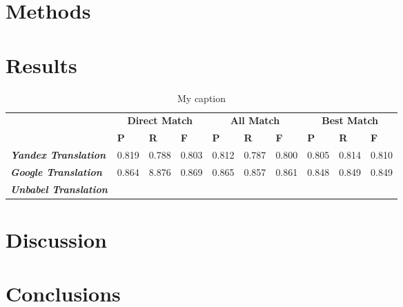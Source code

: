 \label{chap4}



\section{Methods}




\section{Results}

\begin{table}[h]
\centering
\caption{My caption}
\label{table-results}
\begin{tabular}{|l|lll|lll|lll|}
\hline
\multicolumn{1}{|c|}{\textbf{}}       & \multicolumn{3}{c|}{\textbf{Direct Match}}                           & \multicolumn{3}{c|}{\textbf{All Match}}                              & \multicolumn{3}{c|}{\textbf{Best Match}}                             \\
                                      & \textbf{P}                 & \textbf{R}                 & \textbf{F} & \textbf{P}                 & \textbf{R}                 & \textbf{F} & \textbf{P}                 & \textbf{R}                 & \textbf{F} \\ \hline
\textit{\textbf{Yandex Translation}}  & \multicolumn{1}{l|}{0.819} & \multicolumn{1}{l|}{0.788} & 0.803      & \multicolumn{1}{l|}{0.812} & \multicolumn{1}{l|}{0.787} & 0.800      & \multicolumn{1}{l|}{0.805} & \multicolumn{1}{l|}{0.814} & 0.810      \\ \cline{2-10} 
\textit{\textbf{Google Translation}}  & \multicolumn{1}{l|}{0.864} & \multicolumn{1}{l|}{8.876} & 0.869      & \multicolumn{1}{l|}{0.865} & \multicolumn{1}{l|}{0.857} & 0.861      & \multicolumn{1}{l|}{0.848} & \multicolumn{1}{l|}{0.849} & 0.849      \\ \cline{2-10} 
\textit{\textbf{Unbabel Translation}} & \multicolumn{1}{l|}{}      & \multicolumn{1}{l|}{}      &            & \multicolumn{1}{l|}{}      & \multicolumn{1}{l|}{}      &            & \multicolumn{1}{l|}{}      & \multicolumn{1}{l|}{}      &            \\ \hline
\end{tabular}
\end{table}


\section{Discussion}





\section{Conclusions}




  

